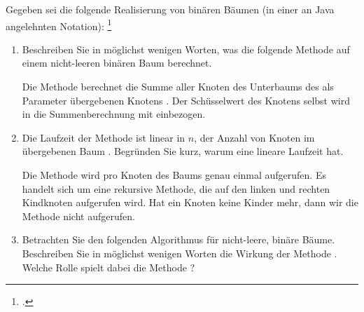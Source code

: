 \documentclass{bschlangaul-aufgabe}
\begin{document}

Gegeben sei die folgende Realisierung von binären Bäumen (in einer an
Java angelehnten Notation):
\footcite{examen:66115:2019:09}


\begin{enumerate}

\item Beschreiben Sie in möglichst wenigen Worten, was die folgende
Methode  auf einem nicht-leeren binären Baum berechnet.


\begin{bAntwort}
Die Methode  berechnet die Summe aller Knoten
des Unterbaums des als Parameter übergebenen Knotens .
Der Schüsselwert des Knotens  selbst wird in die
Summenberechnung mit einbezogen.
\end{bAntwort}


\item Die Laufzeit der Methode  ist linear in $n$,
der Anzahl von Knoten im übergebenen Baum . Begründen
Sie kurz, warum   eine lineare Laufzeit hat.

\begin{bAntwort}
Die Methode  wird pro Knoten des Baums
 genau einmal aufgerufen. Es handelt sich um eine
rekursive Methode, die auf den linken und rechten Kindknoten aufgerufen
wird. Hat ein Knoten keine Kinder mehr, dann wir die Methode nicht
aufgerufen.
\end{bAntwort}


\item Betrachten Sie den folgenden Algorithmus für nicht-leere, binäre
Bäume. Beschreiben Sie in möglichst wenigen Worten die Wirkung der
Methode . Welche Rolle spielt dabei die Methode
?


\end{enumerate}
\end{document}
